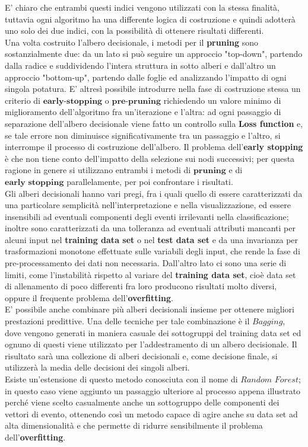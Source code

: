E' chiaro che entrambi questi indici vengono utilizzati con la stessa finalità, tuttavia ogni algoritmo ha una differente logica di costruzione e quindi adotterà uno solo dei due indici, con la possibilità di ottenere risultati differenti. \\
Una volta costruito l'albero decisionale, i metodi per il \textbf{pruning} sono sostanzialmente due: da un lato si può seguire un approccio "top-down", partendo dalla radice e suddividendo l'intera struttura in sotto alberi e dall'altro un approccio "bottom-up", partendo dalle foglie ed analizzando l'impatto di ogni singola potatura. E' altresì possibile introdurre nella fase di costruzione stessa un criterio di $\textbf{early-stopping}$ o $\textbf{pre-pruning}$ richiedendo un valore minimo di miglioramento dell'algoritmo fra un'iterazione e l'altra: ad ogni passaggio di separazione dell'albero decisionale viene fatto un controllo sulla \textbf{Loss function} e, se tale errore non diminuisce significativamente tra un passaggio e l'altro, si interrompe il processo di costruzione dell'albero. Il problema dell'\textbf{early stopping} è che non tiene conto dell'impatto della selezione sui nodi successivi; per questa ragione in genere si utilizzano entrambi i metodi di $\textbf{pruning}$ e di $\textbf{early stopping}$ parallelamente, per poi confrontare i risultati. \\

Gli alberi decisionali hanno vari pregi, fra i quali quello di essere caratterizzati da una particolare semplicità nell'interpretazione e nella visualizzazione, ed essere insensibili ad eventuali componenti degli eventi irrilevanti nella classificazione; inoltre sono caratterizzati da una tolleranza ad eventuali attributi mancanti per alcuni input nel \textbf{training data set} o nel \textbf{test data set} e da una invarianza per trasformazioni monotone effettuate sulle variabili degli input, che rende la fase di pre-processamento dei dati non necessaria. Dall'altro lato ci sono una serie di limiti, come l'instabilità rispetto al variare del \textbf{training data set}, cioè data set di allenamento di poco differenti fra loro producono risultati molto diversi, oppure il frequente problema dell'\textbf{overfitting}. \\
E' possibile anche combinare più alberi decisionali insieme per ottenere migliori prestazioni predittive. Una delle tecniche per tale combinazione è il $\textit{Bagging}$, dove vengono generati in maniera casuale dei sottogruppi del training data set ed ognuno di questi viene utilizzato per l'addestramento di un albero decisionale. Il risultato sarà una collezione di alberi decisionali e, come decisione finale, si utilizzerà la media delle decisioni dei singoli alberi. \\
Esiste un'estensione di questo metodo conosciuta con il nome di $\textit{Random Forest}$; in questo caso viene aggiunto un passaggio ulteriore al processo appena illustrato perché viene scelto casualmente anche un sottogruppo delle componenti dei vettori di evento, ottenendo così un metodo capace di agire anche su data set ad alta dimensionalità e che permette di ridurre sensibilmente il problema dell'\textbf{overfitting}.

